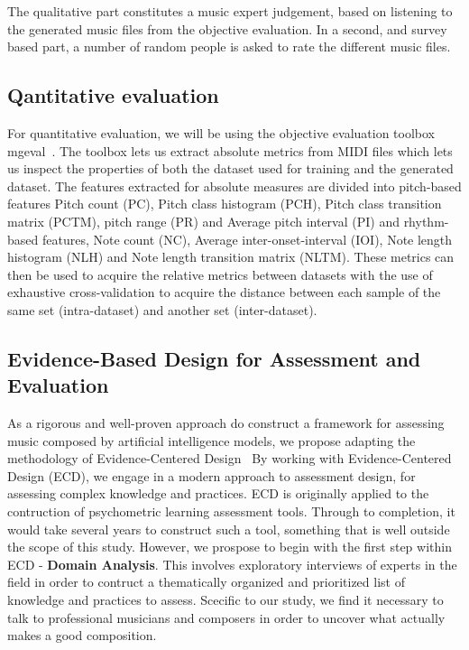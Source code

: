 \documentclass{IEEEtran}
\begin{document}
        The qualitative part constitutes a music expert judgement,
        based on listening to the generated music files from the objective evaluation.
        In a second, and survey based part, a number of random people is asked
        to rate the different music files.
        
        \subsection{Qantitative evaluation}
        
        For quantitative evaluation, we will be using the objective
        evaluation toolbox mgeval~\cite{yang2020evaluation}.
        The toolbox lets us extract absolute metrics from MIDI files
        which lets us inspect the properties of both the dataset used
        for training and the generated dataset. The features extracted
        for absolute measures are divided into pitch-based features Pitch count (PC),
        Pitch class histogram (PCH), Pitch class transition matrix (PCTM),
        pitch range (PR) and Average pitch interval (PI) and rhythm-based features,
        Note count (NC), Average inter-onset-interval (IOI), Note length
        histogram (NLH) and Note length transition matrix (NLTM).
        These metrics can then be used to acquire the relative metrics between
        datasets with the use of exhaustive cross-validation to acquire the
        distance between each sample of the same set (intra-dataset) and another
        set (inter-dataset). 
        
        \subsection{Evidence-Based Design for Assessment and Evaluation}
        As a rigorous and well-proven approach do construct a framework for 
        assessing music composed by artificial intelligence models, we propose 
        adapting the methodology of Evidence-Centered
        Design~\cite{mislevy2003focus,mislevy2017evidence}
        By working with Evidence-Centered Design (ECD), we engage in a modern
        approach to assessment design,
        for assessing complex knowledge and practices.
        ECD is originally applied to the contruction of psychometric learning
        assessment tools. Through to completion, it would take several years to 
        construct such a tool, something that is well outside the scope of this 
        study. However, we prospose to begin with the first step within ECD - 
        \textbf{Domain Analysis}. This involves exploratory interviews of experts
        in the field in order to contruct a thematically organized and prioritized
        list of knowledge and practices to assess. Scecific to our study,
        we find it necessary to talk to professional musicians and composers 
        in order to uncover what actually makes a good composition.
        
\end{document}
